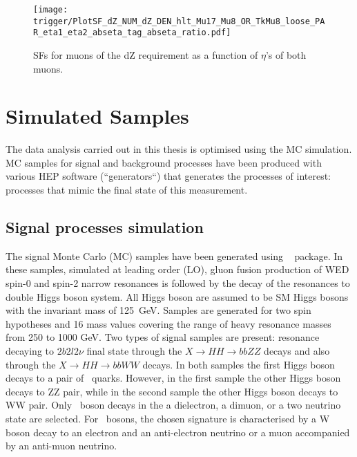 \begin{figure}[H]
\centering
\texttt{[image: trigger/PlotSF\_dZ\_NUM\_dZ\_DEN\_hlt\_Mu17\_Mu8\_OR\_TkMu8\_loose\_PAR\_eta1\_eta2\_abseta\_tag\_abseta\_ratio.pdf]}
\caption[SFs for muons of the dZ requirement .]{SFs for muons of the dZ requirement as a function of $\eta$'s of both muons.}
\label{fig:trigger_SF_dimu_dZ_H}
\end{figure}



\section{Simulated Samples}
\label{sec:simulated_samples}

The data analysis carried out in this thesis is optimised using the MC simulation. MC samples for signal and background processes have been produced with various HEP software (``generators``) that generates the processes of interest: processes that mimic the final state of this measurement. 

\subsection{Signal processes simulation\label{sec:signalMC}}


%
%
The signal Monte Carlo (MC) samples 
have been generated using {\MGMCatNLO}
~\cite{Alwall:2014hca} package. In these samples, simulated at leading
order (LO), gluon fusion production of WED spin-0 and spin-2 narrow resonances is
followed by the decay of the resonances to double Higgs boson system. All Higgs boson are assumed to be SM Higgs bosons with the invariant mass of 125~GeV. Samples are generated for two spin hypotheses and 16 mass values covering the range of heavy resonance masses from 250 to 1000 GeV. Two types of signal samples are present: resonance decaying to $2b 2l 2\nu$ final state through the $X \rightarrow HH \rightarrow bbZZ$ decays and also through the $X \rightarrow HH \rightarrow bbWW$ decays. In both samples the first Higgs boson decays to a pair of \PQb ~quarks. However, in the first sample the other Higgs boson decays to ZZ pair, while 
in the second sample the other Higgs boson decays to WW pair. Only \PZ ~boson decays in the a dielectron,  a dimuon, or a two neutrino state are selected. For \PW ~bosons, the chosen signature is characterised by a W boson decay to an electron and an anti-electron neutrino or a muon accompanied by an anti-muon neutrino.

